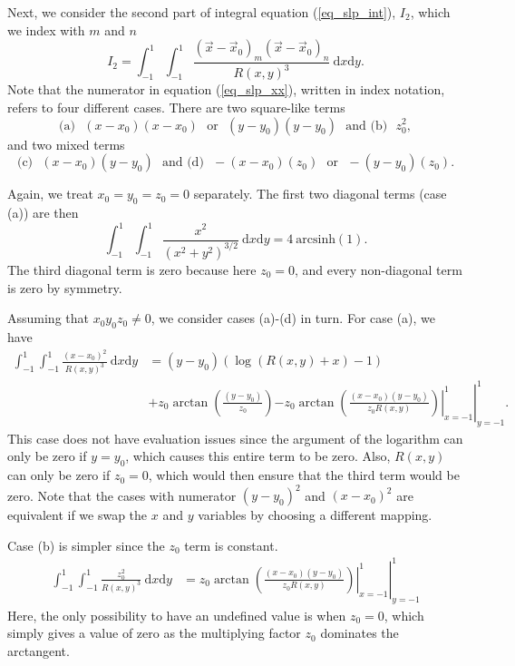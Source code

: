 Next, we consider the second part of integral equation (\ref{eq_slp_int}), $I_2$, which we index with $m$ and $n$
\begin{equation}
I_2 = \int_{-1}^1  \int_{-1}^1  \frac{(\vec{x}-\vec{x}_0)_m (\vec{x}-\vec{x}_0)_n }{R(x,y)^3}
	\ \text{d}x \text{d}y
.
\label{eq_slp_xx}
\end{equation}
Note that the numerator in equation (\ref{eq_slp_xx}), written in index notation,  refers to four different cases. There are two square-like terms
\begin{equation*}
\text{(a)} ~~~	(x-x_0)(x-x_0) ~~~ \text{or} ~~~	(y-y_0)(y-y_0)
	  ~~~\text{and (b)} ~~~ 	z_0^2,
\end{equation*}
and two mixed terms
\begin{equation*}
\text{(c)} ~~~	(x-x_0)(y-y_0)
	 ~~~ 	\text{and (d)} ~~~-(x-x_0)(z_0)
	 ~~~ \text{or} ~~~	-(y-y_0)(z_0).
\end{equation*}

Again, we treat $x_0=y_0=z_0=0$ separately. The first two diagonal terms (case (a)) are then
\begin{equation}
	\int _{-1}^1\int _{-1}^1
	\frac{x^2}{\left(x^2+y^2\right)^{3/2}}
	\ \text{d}x \text{d}y
	=4 \ \text{arcsinh}(1).
\end{equation}
The third diagonal term is zero because here $z_0=0$, and every non-diagonal term is zero by symmetry.

Assuming that $x_0y_0z_0\neq0$,  we consider cases (a)-(d) in turn.
For case (a), we have
\begin{align}
\int_{-1}^1 \int_{-1}^1 \frac{(x-x_0)^2 }{R(x,y)^{3}}  \ \text{d}x \text{d}y
&=(y-y_0) \left(\log \left(R(x,y)+x\right)-1\right) \nonumber \\ 
 &+z_0  \arctan\left(\frac{(y-y_0)}{z_0}\right) \left. \left.
-z_0 \arctan\left(\frac{(x-x_0)(y-y_0)}{ z_0R(x,y)}\right) \right|_{x=-1}^1 \right|_{y=-1}^1 .
\label{eq_slp_int_xx}
\end{align}
This case does not have evaluation issues since the argument of the logarithm can only be zero if $y=y_0$, which causes this entire term to be zero. Also, $R(x,y)$ can only be zero if $z_0=0$, which would then ensure that the third term would be zero. 
Note that the cases with numerator $(y-y_0)^2$ and  $(x-x_0)^2$ are equivalent if we swap the $x$ and $y$ variables by choosing a different mapping.


Case (b) is simpler since the $z_0$ term is constant. 
\begin{align}
\int_{-1}^1 \int_{-1}^1 \frac{z_0^2 }{R(x,y)^{3}}  \ \text{d}x \text{d}y
&= \left. \left.
z_0  \arctan \left(\frac{(x-x_0) (y-y_0)}{z_0  R(x,y)  }\right) \right|_{x=-1}^1 \right|_{y=-1}^1 
\label{eq_slp_int_zz}
\end{align}
Here, the only possibility to have an undefined value is when $z_0=0$, which simply gives a value of zero as the multiplying factor $z_0$ dominates the arctangent.



